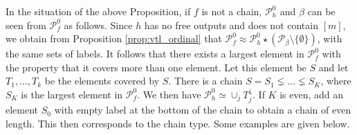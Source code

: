\documentclass[12pt]{article}
\theoremstyle{definition}
\theoremstyle{remark}
\def\Pe{\mathcal P}
\begin{document}
In the situation of the above Proposition, if $f$ is not a chain, $\Pe_h^0$ and  $\beta$ can be
seen from $\Pe_f^0$ as follows. 
Since $h$ has no free outputs and does not contain
$[m]$, we obtain from Proposition \ref{prop:vtl_ordinal} that $\Pe_f^0\approx \Pe_h^0\star
(\Pe_\beta\setminus\{\emptyset\})$, with the same sets of labels.
It follows that there exists a largest element in $\Pe_f^0$ with the property that
it covers more than one element. Let this element be $S$ and let $T_1,\dots, T_k$ be the
elements covered by $S$. There is a chain $S=S_1\lneq \dots \lneq S_K$, where $S_K$ is
the largest element in $\Pe_f^0$. We then have $\Pe_h^0\simeq \cup_j T_j^{\downarrow}$. 
If $K$ is even, add an element $S_0$ with empty
label at the bottom of the chain to obtain a chain of even length. This then corresponds
to the chain type.  Some examples are given below.
\end{document}
